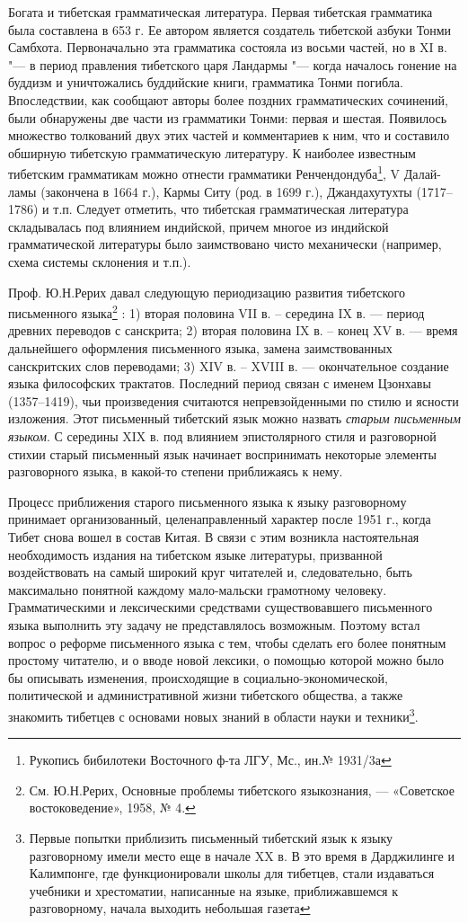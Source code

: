Богата и тибетская грамматическая литература. Первая тибетская грамматика была составлена в 653 г. Ее автором является создатель тибетской азбуки Тонми Самбхота. Первоначально эта грамматика состояла из восьми частей, но в XI в. "--- в период правления тибетского царя Ландармы  "--- когда началось гонение на буддизм и уничтожались буддийские книги, грамматика Тонми погибла. Впоследствии, как сообщают авторы более поздних грамматических сочинений, были обнаружены две части из грамматики Тонми: первая и шестая. Появилось множество толкований двух этих частей и комментариев к ним, что и составило обширную тибетскую грамматическую литературу. К наиболее известным тибетским грамматикам можно отнести грамматики Ренчендондуба\footnote[3]{Рукопись бибилотеки Восточного ф-та ЛГУ, Мс., ин.№ 1931/3а}, V Далай-ламы (закончена в 1664 г.), Кармы Ситу (род. в 1699 г.), Джандахутухты (1717--1786) и т.п. Следует отметить, что тибетская грамматическая литература складывалась под влиянием индийской, причем многое из индийской грамматической литературы было заимствовано чисто механически (например, схема системы склонения и т.п.).

Проф. Ю.Н.Рерих давал следующую периодизацию развития тибетского письменного языка\footnote[4]{См. Ю.Н.Рерих, Основные проблемы тибетского языкознания, --- «Советское востоковедение», 1958, № 4.} : 1) вторая половина VII в. -- середина IX в. --- период древних переводов с санскрита; 2) вторая половина IX в. -- конец XV в. --- время дальнейшего оформления письменного языка, замена заимствованных санскритских слов переводами; 3) XIV в. -- XVIII в. --- окончательное создание языка философских трактатов. Последний период связан с именем Цзонхавы (1357--1419), чьи произведения считаются непревзойденными по стилю и ясности изложения. Этот письменный тибетский язык можно назвать \emph{старым письменным языком}. С середины XIX в. под влиянием эпистолярного стиля и разговорной стихии старый письменный язык начинает воспринимать некоторые элементы разговорного языка, в какой-то степени приближаясь к нему.

Процесс приближения старого письменного языка к языку разговорному принимает организованный, целенаправленный характер после 1951 г., когда Тибет снова вошел в состав Китая. В связи с этим возникла настоятельная необходимость издания на тибетском языке литературы, призванной воздействовать на самый широкий круг читателей и, следовательно, быть максимально понятной каждому мало-мальски грамотному человеку. Грамматическими и лексическими средствами существовавшего письменного языка выполнить эту задачу не представлялось возможным. Поэтому встал вопрос о реформе письменного языка с тем, чтобы сделать его более понятным простому читателю, и о вводе новой лексики, о помощью которой можно было бы описывать изменения, происходящие в социально-экономической, политической и административной жизни тибетского общества, а также знакомить тибетцев с основами новых знаний в области науки и техники\footnote[5]{Первые попытки приблизить письменный тибетский язык к языку разговорному имели место еще в начале XX в. В это время в Дарджилинге и Калимпонге, где функционировали школы для тибетцев, стали издаваться учебники и хрестоматии, написанные на языке, приближавшемся к разговорному, начала выходить небольшая газета}.

